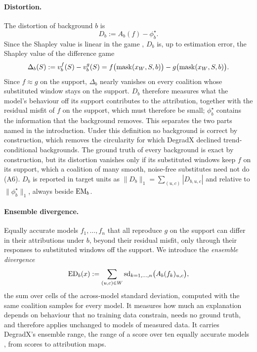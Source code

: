 \documentclass{article}
\begin{document}
\paragraph{Distortion.} The distortion of background $b$ is
\begin{equation}\label{eq:distortion}
D_b := A_b(f) - \phi^\star_b .
\end{equation}
Since the Shapley value is linear in the game \citep{sundararajan2020many}, $D_b$ is, up to estimation error, the Shapley value of the difference game
\begin{equation}\label{eq:diffgame}
\Delta_b(S) := v^f_b(S)-v^g_b(S) = f\bigl(\operatorname{mask}(x_W,S,b)\bigr)-g\bigl(\operatorname{mask}(x_W,S,b)\bigr).
\end{equation}
Since $f\approx g$ on the support, $\Delta_b$ nearly vanishes on every coalition whose substituted window stays on the support. $D_b$ therefore measures what the model's behaviour off its support contributes to the attribution, together with the residual misfit of $f$ on the support, which must therefore be small; $\phi^\star_b$ contains the information that the background removes. This separates the two parts named in the introduction. Under this definition no background is correct by construction, which removes the circularity for which DegradX declined trend-conditional backgrounds. The ground truth of every background is exact by construction, but its distortion vanishes only if its substituted windows keep $f$ on its support, which a coalition of many smooth, noise-free substitutes need not do (A6). $D_b$ is reported in target units as $\|D_b\|_1=\sum_{(u,c)}|D_{b,u,c}|$ and relative to $\|\phi^\star_b\|_1$, always beside $\mathrm{EM}_b$.

\paragraph{Ensemble divergence.} Equally accurate models $f_1,\dots,f_n$ that all reproduce $g$ on the support can differ in their attributions under $b$, beyond their residual misfit, only through their responses to substituted windows off the support. We introduce the \emph{ensemble divergence}
\begin{equation}\label{eq:ed}
\mathrm{ED}_b(x) := \sum_{(u,c)\in W} \operatorname{sd}_{k=1,\dots,n}\bigl(A_b(f_k)_{u,c}\bigr),
\end{equation}
the sum over cells of the across-model standard deviation, computed with the same coalition samples for every model. It measures how much an explanation depends on behaviour that no training data constrain, needs no ground truth, and therefore applies unchanged to models of measured data. It carries DegradX's ensemble range, the range of a score over ten equally accurate models \citep{degradx2026}, from scores to attribution maps.
\end{document}
